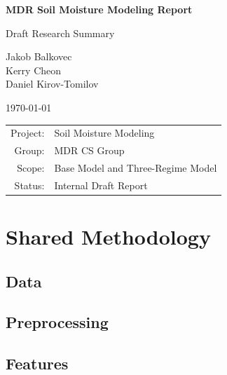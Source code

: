 \documentclass[11pt]{article}
\begin{document}
\begin{titlepage}
    \centering
    \vspace*{2cm}

    {\Huge \textbf{MDR Soil Moisture Modeling Report}\par}
    \vspace{0.4cm}
    {\Large Draft Research Summary\par}

    \vspace{1.5cm}

    {\large
    Jakob Balkovec\\
    Kerry Cheon\\
    Daniel Kirov-Tomilov\par}

    \vspace{1cm}

    {\large \today\par}

    \vfill

    \begin{tabular}{rl}
        Project: & Soil Moisture Modeling \\
        Group: & MDR CS Group \\
        Scope: & Base Model and Three-Regime Model \\
        Status: & Internal Draft Report
    \end{tabular}

    \vfill
\end{titlepage}

\tableofcontents
\newpage

\section{Shared Methodology}

\subsection{Data}


\subsection{Preprocessing}


\subsection{Features}

\end{document}
